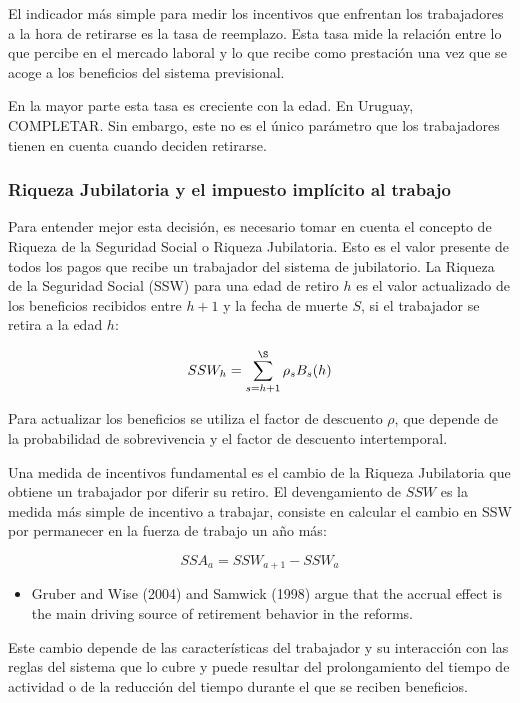 \documentclass[]{article}
\providecommand{\tightlist}{%
  \setlength{\itemsep}{0pt}\setlength{\parskip}{0pt}}
\begin{document}
El indicador más simple para medir los incentivos que enfrentan los
trabajadores a la hora de retirarse es la tasa de reemplazo. Esta tasa
mide la relación entre lo que percibe en el mercado laboral y lo que
recibe como prestación una vez que se acoge a los beneficios del sistema
previsional.

En la mayor parte esta tasa es creciente con la edad. En Uruguay,
COMPLETAR. Sin embargo, este no es el único parámetro que los
trabajadores tienen en cuenta cuando deciden retirarse.

\subsubsection{Riqueza Jubilatoria y el impuesto implícito al
trabajo}\label{riqueza-jubilatoria-y-el-impuesto-implicito-al-trabajo}

Para entender mejor esta decisión, es necesario tomar en cuenta el
concepto de Riqueza de la Seguridad Social o Riqueza Jubilatoria. Esto
es el valor presente de todos los pagos que recibe un trabajador del
sistema de jubilatorio. La Riqueza de la Seguridad Social (SSW) para una
edad de retiro \(h\) es el valor actualizado de los beneficios recibidos
entre \(h + 1\) y la fecha de muerte \(S\), si el trabajador se retira a
la edad \(h\):

\[ SSW_{h} = \sum_{s=h+1}^{\S} \rho_{s} B_{s}(h)\]

Para actualizar los beneficios se utiliza el factor de descuento
\(\rho\), que depende de la probabilidad de sobrevivencia y el factor de
descuento intertemporal.

Una medida de incentivos fundamental es el cambio de la Riqueza
Jubilatoria que obtiene un trabajador por diferir su retiro. El
devengamiento de \(SSW\) es la medida más simple de incentivo a
trabajar, consiste en calcular el cambio en SSW por permanecer en la
fuerza de trabajo un año más:

\[ SSA_{a} = SSW_{a+1} - SSW_{a}\]

\begin{itemize}
\tightlist
\item
  Gruber and Wise (2004) and Samwick (1998) argue that the accrual
  effect is the main driving source of retirement behavior in the
  reforms.
\end{itemize}

Este cambio depende de las características del trabajador y su
interacción con las reglas del sistema que lo cubre y puede resultar del
prolongamiento del tiempo de actividad o de la reducción del tiempo
durante el que se reciben beneficios.
\end{document}
